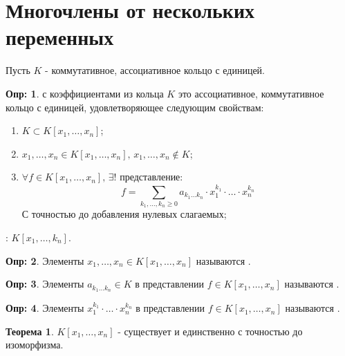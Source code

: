 \documentclass[12pt]{article}
\newcommand{\RN}[1]{%
	\textup{\uppercase\expandafter{\romannumeral#1}}%
}
\theoremstyle{definition}
\newtheorem{defn}{Опр:}
\newtheorem{theorem}{Теорема}
\newcommand{\ddsum}[2]{\displaystyle\sum\limits_{#1}^{#2}}
\begin{document}
\lhead{Алгебра-\RN{1}}

\section*{Многочлены от нескольких переменных}
Пусть $K$ - коммутативное, ассоциативное кольцо с единицей.
\begin{defn}
	 с коэффициентами из кольца $K$ это ассоциативное, коммутативное кольцо с единицей, удовлетворяющее следующим свойствам:
	\begin{enumerate}[label=\arabic*)]
		\item $K \subset K[x_1,\dotsc, x_n]$;
		\item $x_1,\dotsc,x_n \in K[x_1,\dotsc, x_n], \, x_1,\dotsc, x_n \not\in K$;
		\item $\forall f \in K[x_1,\dotsc,x_n], \, \exists!$ представление: 
		$$
			f = \ddsum{k_1,\dotsc,k_n \geq 0}{}a_{k_1\dotsc k_n}{\cdot}x_1^{k_1}{\cdot}\dotsc{\cdot}x_n^{k_n}
		$$ 
		С точностью до добавления нулевых слагаемых;
	\end{enumerate}
	\textbf{}: $K[x_1,\dotsc, k_n]$.
\end{defn}
\begin{defn}
	Элементы $x_1,\dotsc,x_n \in K[x_1,\dotsc, x_n]$ называются .
\end{defn}
\begin{defn}
	Элементы $a_{k_1\dotsc k_n} \in K$ в представлении $f \in K[x_1,\dotsc,x_n]$ называются .
\end{defn}
\begin{defn}
	Элементы $x_1^{k_1}{\cdot}\dotsc{\cdot}x_n^{k_n}$ в представлении $f \in K[x_1,\dotsc,x_n]$ называются .
\end{defn}

\begin{theorem}
	$K[x_1,\dotsc,x_n]$ - существует и единственно с точностью до изоморфизма.
\end{theorem}
\end{document}
